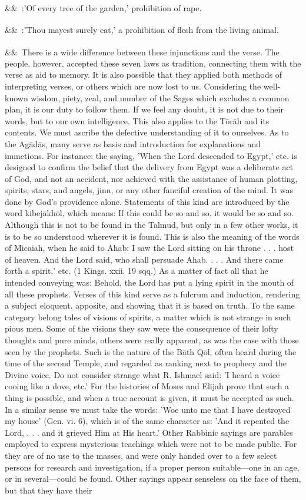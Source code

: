 \documentclass[12pt]{article}
\newcommand{\para}[1][]{\par\noindent\ifx&#1&\else\textsuperscript{\footnotesize #1}~\fi}
\begin{document}
\para :'Of every tree of the garden,' prohibition of rape.

\para :'Thou mayest surely eat,' a prohibition of flesh from the living animal.

\para There is a wide difference between these injunctions and the verse. The people, however, accepted these seven laws as tradition, connecting them with the verse as aid to memory. It is also possible that they applied both methods of interpreting verses, or others which are now lost to us. Considering the well-known wisdom, piety, zeal, and number of the Sages which excludes a common plan, it is our duty to follow them. If we feel any doubt, it is not due to their words, but to our own intelligence. This also applies to the Tōrāh and its contents. We must ascribe the defective understanding of it to ourselves. As to the Agādās, many serve as basis and introduction for explanations and inunctions. For instance: the saying, 'When the Lord descended to Egypt,' etc. is designed to confirm the belief that the delivery from Egypt was a deliberate act of God, and not an accident, nor achieved with the assistance of human plotting, spirits, stars, and angels, jinn, or any other fanciful creation of the mind. It was done by God's providence alone. Statements of this kind are introduced by the word kibejākhōl, which means: If this could be so and so, it would be so and so. Although this is not to be found in the Talmud, but only in a few other works, it is to be so understood wherever it is found. This is also the meaning of the words of Micaiah, when he said to Ahab: I saw the Lord sitting on his throne . . . host of heaven. And the Lord said, who shall persuade Ahab. . . . And there came forth a spirit,' etc. (1 Kings. xxii. 19 sqq.) As a matter of fact all that he intended conveying was: Behold, the Lord has put a lying spirit in the mouth of all these prophets. Verses of this kind serve as a fulcrum and induction, rendering a subject eloquent, apposite, and showing that it is based on truth. To the same category belong tales of visions of spirits, a matter which is not strange in such pious men. Some of the visions they saw were the consequence of their lofty thoughts and pure minds, others were really apparent, as was the case with those seen by the prophets. Such is the nature of the Bāth Qōl, often heard during the time of the second Temple, and regarded as ranking next to prophecy and the Divine voice. Do not consider strange what R. Ishmael said: 'I heard a voice cooing like a dove, etc.' For the histories of Moses and Elijah prove that such a thing is possible, and when a true account is given, it must be accepted as such. In a similar sense we must take the words: 'Woe unto me that I have destroyed my house' (Gen. vi. 6), which is of the same character as: 'And it repented the Lord, . . . and it grieved Him at His heart.' Other Rabbinic sayings are parables employed to express mysterious teachings which were not to be made public. For they are of no use to the masses, and were only handed over to a few select persons for research and investigation, if a proper person suitable---one in an age, or in several---could be found. Other sayings appear senseless on the face of them, but that they have their 
\end{document}
